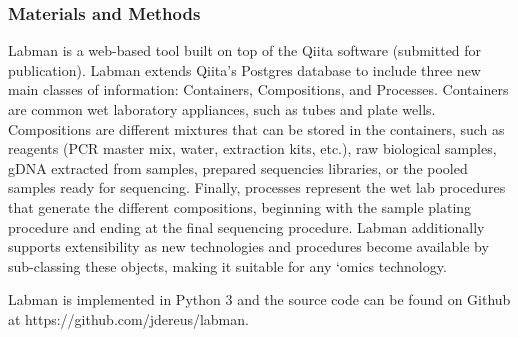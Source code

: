 \subsubsection{Materials and Methods}

Labman is a web-based tool built on top of the Qiita software
(submitted for publication). Labman extends Qiita’s Postgres database to
include three new main classes of information: Containers, Compositions,
and Processes. Containers are common wet laboratory appliances, such as
tubes and plate wells. Compositions are different mixtures that can be stored
in the containers, such as reagents (PCR master mix, water, extraction kits,
etc.), raw biological samples, gDNA extracted from samples, prepared sequencies
libraries, or the pooled samples ready for sequencing. Finally, processes
represent the wet lab procedures that generate the different compositions,
beginning with the sample plating procedure and ending at the final sequencing
procedure. Labman additionally supports extensibility as new technologies and
procedures become available by sub-classing these objects, making it suitable
for any ‘omics technology.

Labman is implemented in Python 3 and the source code can be found on Github
at https://github.com/jdereus/labman.
